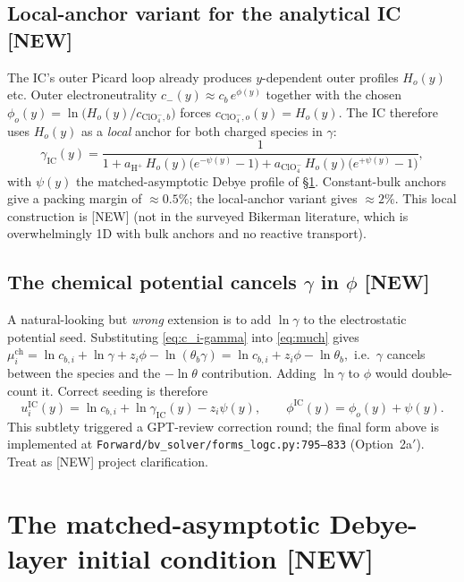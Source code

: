 \documentclass[11pt]{article}
\newcommand{\new}{\textcolor{red!70!black}{[NEW]}}
\newcommand{\ClO}{\text{ClO}_4^-}
\newcommand{\Hp}{\text{H}^+}
\newcommand{\mch}{\mu^{\mathrm{ch}}}
\begin{document}
\subsection{Local-anchor variant for the analytical IC \new}
The IC's outer Picard loop already produces $y$-dependent outer
profiles $H_o(y)$ etc.  Outer electroneutrality
$c_-(y)\approx c_b\, e^{\phi(y)}$ together with the chosen
$\phi_o(y)=\ln\!\bigl(H_o(y)/c_{\ClO,b}\bigr)$ forces
$c_{\ClO,o}(y) = H_o(y)$.  The IC therefore uses $H_o(y)$
as a \emph{local} anchor for both charged species in $\gamma$:
\begin{equation}
  \gamma_{\mathrm{IC}}(y)
   = \frac{1}{1
       + a_{\Hp}\,H_o(y)\bigl(e^{-\psi(y)}-1\bigr)
       + a_{\ClO}\,H_o(y)\bigl(e^{+\psi(y)}-1\bigr)},
  \label{eq:gamma-local}
\end{equation}
with $\psi(y)$ the matched-asymptotic Debye profile of
\S\ref{sec:matched-IC}.  Constant-bulk anchors give a packing
margin of $\approx 0.5\%$; the local-anchor variant gives $\approx 2\%$.
This local construction is \new{} (not in the surveyed Bikerman
literature, which is overwhelmingly 1D with bulk anchors and no
reactive transport).

\subsection{The chemical potential cancels $\gamma$ in $\phi$ \new}
A natural-looking but \emph{wrong} extension is to add $\ln\gamma$
to the electrostatic potential seed.  Substituting
\eqref{eq:c_i-gamma} into \eqref{eq:much} gives
\(
  \mch_i = \ln c_{b,i} + \ln\gamma + z_i\phi - \ln(\theta_b\gamma)
       = \ln c_{b,i} + z_i\phi - \ln\theta_b,
\)
i.e.\ $\gamma$ cancels between the species and the
$-\ln\theta$ contribution.  Adding $\ln\gamma$ to $\phi$ would
double-count it.  Correct seeding is therefore
\begin{equation}
  u_i^{\mathrm{IC}}(y) = \ln c_{b,i} + \ln\gamma_{\mathrm{IC}}(y) - z_i\psi(y), \qquad
  \phi^{\mathrm{IC}}(y) = \phi_o(y) + \psi(y).
  \label{eq:IC-final}
\end{equation}
This subtlety triggered a GPT-review correction round; the final
form above is implemented at
\texttt{Forward/bv\_solver/forms\_logc.py:795--833} (Option~2a$'$).
Treat as \new{} project clarification.

\section{The matched-asymptotic Debye-layer initial condition \new}
\label{sec:matched-IC}
\end{document}
